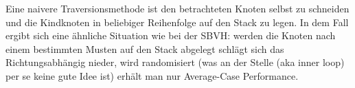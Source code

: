 \documentclass[a4paper,11pt]{article}
\begin{document}
Eine naivere Traversionsmethode ist den betrachteten Knoten selbst zu schneiden und die Kindknoten in beliebiger Reihenfolge auf den Stack zu legen.
In dem Fall ergibt sich eine ähnliche Situation wie bei der SBVH: werden die Knoten nach einem bestimmten Musten auf den Stack abgelegt schlägt sich das Richtungsabhängig nieder, wird randomisiert (was an der Stelle (aka inner loop) per se keine gute Idee ist) erhält man nur Average-Case Performance.




\end{document}
